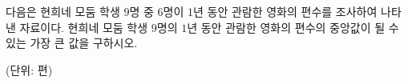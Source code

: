 다음은 현희네 모둠 학생 $9$명 중 $6$명이 $1$년 동안 관람한 영화의 편수를 조사하여 나타낸 자료이다. 현희네 모둠 학생 $9$명의 $1$년 동안 관람한 영화의 편수의 중앙값이 될 수 있는 가장 큰 값을 구하시오.\par{\raggedleft\small (단위: 편)\par}
